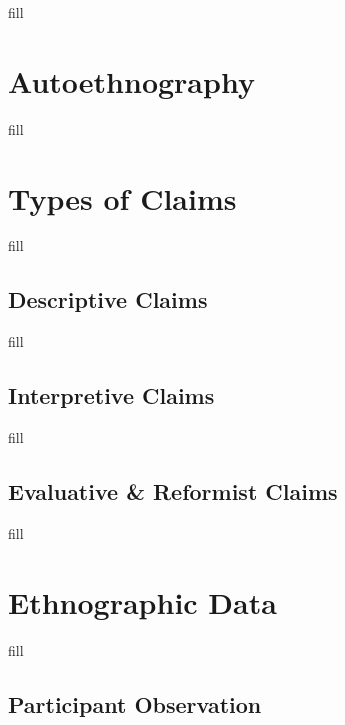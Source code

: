 \documentclass[
  b5paper]{book}
\begin{document}
fill

\hypertarget{autoethnography}{%
\section{Autoethnography}\label{autoethnography}}

fill

\hypertarget{types-of-claims}{%
\section{Types of Claims}\label{types-of-claims}}

fill

\hypertarget{descriptive-claims}{%
\subsection*{Descriptive Claims}\label{descriptive-claims}}

fill

\hypertarget{interpretive-claims}{%
\subsection*{Interpretive Claims}\label{interpretive-claims}}

fill

\hypertarget{evaluative-reformist-claims}{%
\subsection*{Evaluative \& Reformist Claims}\label{evaluative-reformist-claims}}

fill

\hypertarget{ethnographic-data}{%
\section{Ethnographic Data}\label{ethnographic-data}}

fill

\hypertarget{participant-observation}{%
\subsection*{Participant Observation}\label{participant-observation}}
\end{document}
